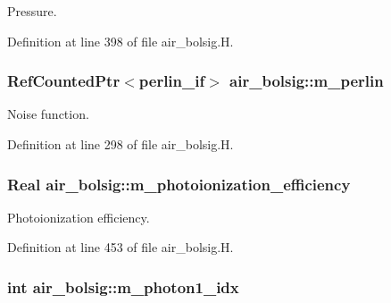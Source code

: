 Pressure. 



Definition at line 398 of file air\+\_\+bolsig.\+H.

\subsubsection[{\texorpdfstring{m\+\_\+perlin}{m_perlin}}]{\setlength{\rightskip}{0pt plus 5cm}Ref\+Counted\+Ptr$<${\bf perlin\+\_\+if}$>$ air\+\_\+bolsig\+::m\+\_\+perlin\hspace{0.3cm}{\ttfamily [protected]}}\hypertarget{classair__bolsig_aa6084fec29a2f45ae6438d68bc1b2ecc}{}\label{classair__bolsig_aa6084fec29a2f45ae6438d68bc1b2ecc}


Noise function. 



Definition at line 298 of file air\+\_\+bolsig.\+H.

\subsubsection[{\texorpdfstring{m\+\_\+photoionization\+\_\+efficiency}{m_photoionization_efficiency}}]{\setlength{\rightskip}{0pt plus 5cm}Real air\+\_\+bolsig\+::m\+\_\+photoionization\+\_\+efficiency\hspace{0.3cm}{\ttfamily [protected]}}\hypertarget{classair__bolsig_a67d63202a4409d315593c848f6fa3756}{}\label{classair__bolsig_a67d63202a4409d315593c848f6fa3756}


Photoionization efficiency. 



Definition at line 453 of file air\+\_\+bolsig.\+H.

\subsubsection[{\texorpdfstring{m\+\_\+photon1\+\_\+idx}{m_photon1_idx}}]{\setlength{\rightskip}{0pt plus 5cm}int air\+\_\+bolsig\+::m\+\_\+photon1\+\_\+idx\hspace{0.3cm}{\ttfamily [protected]}}\hypertarget{classair__bolsig_a0f58433417a8088841cdbe6401b21c79}{}\label{classair__bolsig_a0f58433417a8088841cdbe6401b21c79}


